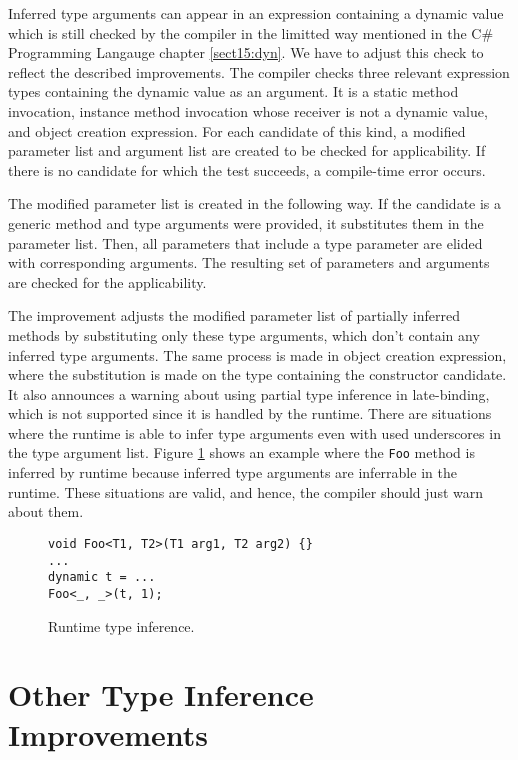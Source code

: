 Inferred type arguments can appear in an expression containing a dynamic value which is still checked by the compiler in the limitted way mentioned in the C\# Programming Langauge chapter \ref{sect15:dyn}.
We have to adjust this check to reflect the described improvements.
The compiler checks three relevant expression types containing the dynamic value as an argument. 
It is a static method invocation, instance method invocation whose receiver is not a dynamic value, and object creation expression. 
For each candidate of this kind, a modified parameter list and argument list are created to be checked for applicability. 
If there is no candidate for which the test succeeds, a compile-time error occurs.
\par
The modified parameter list is created in the following way. 
If the candidate is a generic method and type arguments were provided, it substitutes them in the parameter list. 
Then, all parameters that include a type parameter are elided with corresponding arguments. 
The resulting set of parameters and arguments are checked for the applicability.
\par
The improvement adjusts the modified parameter list of partially inferred methods by substituting only these type arguments, which don’t contain any inferred type arguments. 
The same process is made in object creation expression, where the substitution is made on the type containing the constructor candidate.
It also announces a warning about using partial type inference in late-binding, which is not supported since it is handled by the runtime.
There are situations where the runtime is able to infer type arguments even with used underscores in the type argument list. 
Figure \ref{img63:dinamic} shows an example where the \texttt{Foo} method is inferred by runtime because inferred type arguments are inferrable in the runtime. 
These situations are valid, and hence, the compiler should just warn about them.
\begin{figure}[h!]
\begin{lstlisting}[style=csharp, mathescape=true]
void Foo<T1, T2>(T1 arg1, T2 arg2) {}
...
dynamic t = ...
Foo<_, _>(t, 1);
\end{lstlisting}
\caption{Runtime type inference.}
\label{img63:dinamic}
\end{figure}

\section{Other Type Inference Improvements}

